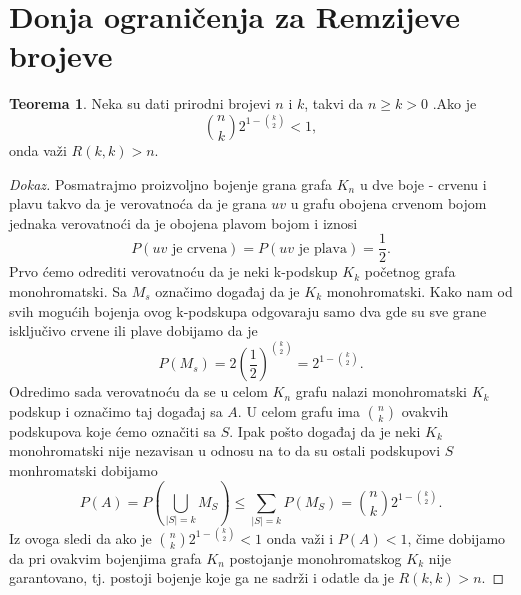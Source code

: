 \documentclass{article}
\theoremstyle{definition}
\newtheorem{teorema}{Teorema}[section]
\newcommand{\dokaz}[1]{\begin{proof}[Dokaz]#1\end{proof}}
\begin{document}
	\section{Donja ograničenja za Remzijeve brojeve}
	\begin{teorema}\label{dot1}
		Neka su dati prirodni brojevi $n$ i $k$, takvi da $n \geq{k} > 0$ .Ako je $$\binom{n}{k}2^{1 - \binom{k}{2}} < 1 ,$$  onda važi $R(k, k) > n$.
		\dokaz{
			Posmatrajmo proizvoljno bojenje grana grafa $K_n$ u dve boje - crvenu i plavu takvo da je verovatnoća da je grana $uv$ u grafu obojena crvenom bojom jednaka verovatnoći da je 		           obojena plavom bojom i iznosi 
			$$P(uv \text{ je crvena}) = P(uv \text{ je plava}) = \frac{1}{2}.$$
			\newline
			Prvo ćemo odrediti verovatnoću da je neki k-podskup $K_k$ početnog grafa monohromatski. 
			Sa $M_s$ označimo događaj da je $K_k$ monohromatski. Kako nam od svih mogućih bojenja ovog k-podskupa odgovaraju samo dva gde su sve grane isključivo crvene ili plave dobijamo
			da je
			$$P(M_s) = 2\left(\frac{1}{2}\right)^{\binom{k}{2}} = 2 ^ {1 - \binom{k}{2}}.$$
			Odredimo sada verovatnoću da se u celom $K_n$ grafu nalazi monohromatski $K_k$ podskup i označimo taj događaj sa $A$. U celom grafu ima $\binom{n}{k}$ ovakvih podskupova koje 			ćemo označiti sa $S$. Ipak pošto događaj da je neki $K_k$ monohromatski nije nezavisan u odnosu na to da su ostali podskupovi $S$ monhromatski dobijamo 
			$$P(A) = P(\bigcup_{|S|=k}M_S) \leq{\sum_{|S|=k}P(M_S)} = \binom{n}{k} 2 ^ {1 - \binom{k}{2}}.$$
			Iz ovoga sledi da ako je $\binom{n}{k} 2 ^ {1 - \binom{k}{2}} < 1$ onda važi i $P(A) < 1$, čime dobijamo da pri ovakvim bojenjima grafa $K_n$ postojanje monohromatskog 
			$K_k$ nije garantovano, tj. postoji bojenje koje ga ne sadrži i odatle da je $R(k,k) > n$.
		}
	\end{teorema}
\end{document}
